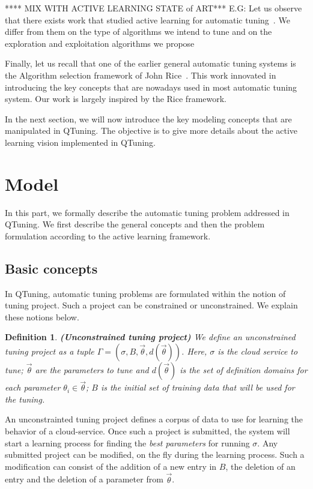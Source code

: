 \documentclass[10pt, conference, compsocconf]{IEEEtran}
\newtheorem{definition}[theorem]{Definition}
\begin{document}
**** MIX WITH ACTIVE LEARNING STATE of ART*** E.G: Let us observe that there exists work that studied active learning for automatic tuning~\cite{DBLP:conf/cluster/BalaprakashGW13}. 
We differ from them on the type of algorithms we intend to tune and on the exploration and exploitation algorithms we propose


Finally, let us recall that one of the earlier general automatic tuning systems is the  Algorithm selection 
framework of John Rice~\cite{Rice}. This work innovated in introducing the key concepts that are nowadays used in most automatic 
tuning system. Our work is largely inspired by the Rice framework.

In the next section, we will now introduce the key modeling concepts that are manipulated in QTuning. The objective is to 
give more details about the active learning vision implemented in QTuning. 


\section{Model} \label{Model}

In this part, we formally describe the automatic tuning problem addressed in QTuning. We first describe 
the general concepts and then the problem formulation according to the active learning framework.
 \subsection{Basic concepts}

In QTuning, automatic tuning problems are formulated within the notion of tuning project.  Such  
a project can be  constrained or unconstrained. We explain these notions below.

\begin{definition}{\bf (Unconstrained tuning project)}
We define an unconstrained tuning project as a tuple $ \Gamma = (\sigma, B, \vec{\theta}, d(\vec{\theta}))$. Here, $\sigma$ is the cloud service to tune; 
$\vec{\theta}$ are the parameters to tune and $d(\vec{\theta})$ is the set of definition domains for each parameter 
$\theta_i \in \vec{\theta}$; $B$ is the initial set of training data that will be used for the tuning.
\end{definition}

An unconstrainted tuning project defines a corpus of data to use for learning the behavior of a cloud-service. 
Once such a project is submitted, the system will start a learning process for finding the {\it best parameters} for 
running $\sigma$. Any submitted project can be modified, on the fly during the learning process. Such a modification can consist of  
the addition of a new entry in $B$, the deletion of an entry and the deletion of a parameter from $\vec{\theta}$. 
\end{document}
